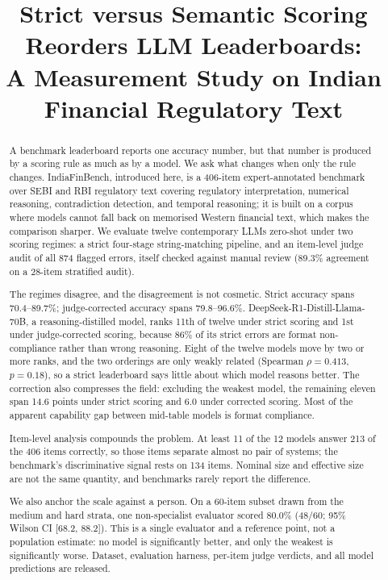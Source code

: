 
\title{Strict versus Semantic Scoring Reorders LLM Leaderboards:\\
A Measurement Study on Indian Financial Regulatory Text}


\begin{abstract}
A benchmark leaderboard reports one accuracy number, but that number is produced by a scoring rule
as much as by a model. We ask what changes when only the rule changes. IndiaFinBench, introduced
here, is a 406-item expert-annotated benchmark over SEBI and RBI regulatory text covering
regulatory interpretation, numerical reasoning, contradiction detection, and temporal reasoning; it
is built on a corpus where models cannot fall back on memorised Western financial text, which makes
the comparison sharper. We evaluate twelve contemporary LLMs zero-shot under two scoring regimes: a
strict four-stage string-matching pipeline, and an item-level judge audit of all 874 flagged errors,
itself checked against manual review (89.3\% agreement on a 28-item stratified audit).

The regimes disagree, and the disagreement is not cosmetic. Strict accuracy spans 70.4--89.7\%;
judge-corrected accuracy spans 79.8--96.6\%. DeepSeek-R1-Distill-Llama-70B, a reasoning-distilled model, ranks
11th of twelve under strict scoring and 1st under judge-corrected scoring, because 86\% of its
strict errors are format non-compliance rather than wrong reasoning. Eight of the twelve models
move by two or more ranks, and the two orderings are only weakly related (Spearman $\rho = 0.413$,
$p = 0.18$), so a strict leaderboard says little about which model reasons better. The correction
also compresses the field: excluding the weakest model, the remaining eleven span 14.6 points under
strict scoring and 6.0 under corrected scoring. Most of the apparent capability gap between
mid-table models is format compliance.

Item-level analysis compounds the problem. At least 11 of the 12 models answer 213 of the 406 items
correctly, so those items separate almost no pair of systems; the benchmark's discriminative signal
rests on 134 items. Nominal size and effective size are not the same quantity, and benchmarks
rarely report the difference.

We also anchor the scale against a person. On a 60-item subset drawn from the medium and hard
strata, one non-specialist evaluator scored 80.0\% (48/60; 95\% Wilson CI [68.2, 88.2]). This is a
single evaluator and a reference point, not a population estimate: no model is significantly better,
and only the weakest is significantly worse. Dataset, evaluation harness, per-item judge verdicts,
and all model predictions are released.
\end{abstract}
